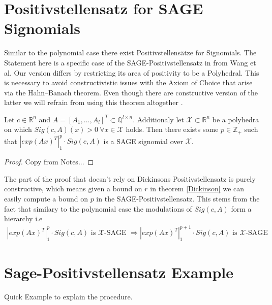 \documentclass[./main.tex]{subfiles}
\begin{document}
\section{Positivstellensatz for SAGE Signomials}
Similar to the polynomial case there exist Positivstellensätze for Signomials. The Statement here is a specific case of the SAGE-Positivstellensatz in \cite{wang2020positivstellensatz} from Wang et al. Our version differs by restricting its area of positivity to be a Polyhedral. This is necessary to avoid constructivistic issues with the Axiom of Choice that arise  via the Hahn–Banach theorem. Even though there are constructive version of the latter we will refrain from using this theorem altogether .
\begin{thm}
\label{SAGEthm}

 Let $c \in \mathbb{R}^n$ and $A = \left[A_1,\dots, A_l \right]^T \subset \mathbb{Q}^{l\times n}$. Additionaly let $\mathcal{X} \subset \mathbb{R}^n$ be a polyhedra on which $Sig(c,A)(x) > 0 \ \forall x \in \mathcal{X}$ holds. Then there exists some $p \in \mathbb{Z}_+$ such that $|exp(Ax)^T|^p_1 \cdot Sig(c,A)$ is a SAGE signomial over $\mathcal{X}$.
\begin{proof}
Copy from Notes...
\end{proof}
\end{thm}
The part of the proof that doesn't rely on Dickinsons Positivstellensatz  is purely constructive, which means given a bound on $r$ in theorem \ref{Dickinson} we can easily compute a bound on $p$ in the SAGE-Positivstellensatz. This stems from the fact that similary to the polynomial case the modulations of $Sig(c,A)$ form a hierarchy i.e 
\begin{align*}
 |exp(Ax)^T|^p_1 \cdot Sig(c,A) \text{ is } \mathcal{X}\text{-SAGE } \Rightarrow |exp(Ax)^T|^{p+1}_1 \cdot Sig(c,A) \text{ is } \mathcal{X}\text{-SAGE }
\end{align*}
\section{Sage-Positivstellensatz Example}
Quick Example to explain the procedure.
\end{document}
